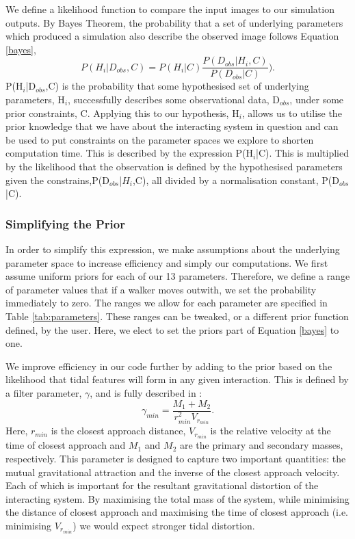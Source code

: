 We define a likelihood function to compare the input images to our simulation outputs. By Bayes Theorem, the probability that a set of underlying parameters which produced a simulation also describe the observed image follows Equation \ref{bayes},
\begin{equation}\label{bayes}
    P(H_{i}|D_{obs},C) = P(H_{i}|C)\frac{P(D_{obs}|H_{i},C)}{P(D_{obs}|C)}).
\end{equation}
P(H$_{i}$|D$_{obs}$,C) is the probability that some hypothesised set of underlying parameters, H$_{i}$, successfully describes some observational data, D$_{obs}$, under some prior constraints, C. Applying this to our hypothesis, H$_{i}$, allows us to utilise the prior knowledge that we have about the interacting system in question and can be used to put constraints on the parameter spaces we explore to shorten computation time. This is described by the expression P(H$_{i}$|C). This is multiplied by the likelihood that the observation is defined by the hypothesised parameters given the constrains,P(D$_{obs}$|$H_{i}$,C), all divided by a normalisation constant, P(D$_{obs}$|C).

\subsubsection{Simplifying the Prior}
In order to simplify this expression, we make assumptions about the underlying parameter space to increase efficiency and simply our computations. We first assume uniform priors for each of our 13 parameters. Therefore, we define a range of parameter values that if a walker moves outwith, we set the probability immediately to zero. The ranges we allow for each parameter are specified in Table \ref{tab:parameters}. These ranges can be tweaked, or a different prior function defined, by the user. Here, we elect to set the priors part of Equation \ref{bayes} to one.

We improve efficiency in our code further by adding to the prior based on the likelihood that tidal features will form in any given interaction. This is defined by a filter parameter, $\gamma$, and is fully described in \citet[][where it is called $\beta$ but we call it $\gamma$ here to not be confused with our star formation enhancement parameter of Equation \ref{enhancement_param}]{2016MNRAS.459..720H}:
\begin{equation}\label{gamma_param}
    \gamma_{min} = \frac{M_{1} + M_{2}}{r_{min}^{2}V_{r_{min}}}.
\end{equation}
Here, $r_{min}$ is the closest approach distance, $V_{r_{min}}$ is the relative velocity at the time of closest approach and $M_{1}$ and $M_{2}$ are the primary and secondary masses, respectively. This parameter is designed to capture two important quantities: the mutual gravitational attraction and the inverse of the closest approach velocity. Each of which is important for the resultant gravitational distortion of the interacting system. By maximising the total mass of the system, while minimising the distance of closest approach and maximising the time of closest approach (i.e. minimising $V_{r_{min}}$) we would expect stronger tidal distortion. 

